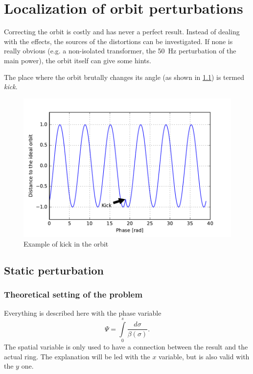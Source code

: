 
\chapter{Localization of orbit perturbations}
\label{sec:localisation}

Correcting the orbit is costly and has never a perfect result. Instead of dealing with the effects, the sources of the distortions can be investigated. If none is really obvious (e.g. a non-isolated transformer, the 50~Hz perturbation of the main power), the orbit itself can give some hints.

The place where the orbit brutally changes its angle (as shown in \cref{fig:kick}) is termed \textit{kick}.

\begin{figure}[!h]
	\centering
	\includegraphics[width=.9\linewidth]{img/kick}
	\caption{\label{fig:kick}Example of kick in the orbit}
\end{figure}

\section{Static perturbation}
\label{sec:loc_static}

\subsection{Theoretical setting of the problem}

Everything is described here with the phase variable 
\begin{equation}
\Psi = \int\limits_{0}^s \frac{d\sigma}{\beta(\sigma)}.
\end{equation}
The spatial variable is only used to have a connection between the result and the actual ring. The explanation will be led with the $x$ variable, but is also valid with the $y$ one.

